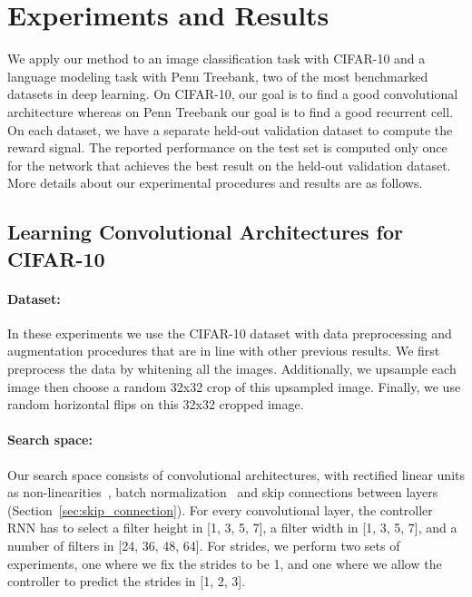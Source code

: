 \documentclass{article} \usepackage{iclr2017_conference,times}
\begin{document}
\section{Experiments and Results}
\label{others}

We apply our method to an image classification task with CIFAR-10 and a language modeling task with Penn Treebank, two of the most benchmarked datasets in deep learning. On CIFAR-10, our goal is to find a good convolutional architecture whereas on Penn Treebank our goal is to find a good recurrent cell. On each dataset, we have a separate held-out validation dataset to compute the reward signal. The reported performance on the test set is computed only once for the network that achieves the  best result on the held-out validation dataset. More details about our experimental procedures and results are as follows.




\subsection{Learning Convolutional Architectures for CIFAR-10}

\paragraph{Dataset:} In these experiments we use the CIFAR-10 dataset with data preprocessing and augmentation procedures that are in line with other previous results. We first preprocess the data by whitening all the images. Additionally, we upsample each image then choose a random 32x32 crop of this upsampled image. Finally, we use random horizontal flips on this 32x32 cropped image.


\paragraph{Search space:} Our search space consists of convolutional architectures, with rectified linear units as non-linearities~\citep{nair2010rectified}, batch normalization~\citep{BatchNorm} and skip connections between layers (Section~\ref{sec:skip_connection}). For every convolutional layer, the controller RNN has to select a filter height in [1, 3, 5, 7], a filter width in [1, 3, 5, 7], and a number of filters in [24, 36, 48, 64].
For strides, we perform two sets of experiments, one where we fix the strides to be 1, and one where we allow the controller to predict the strides in [1, 2, 3]. 
\end{document}
